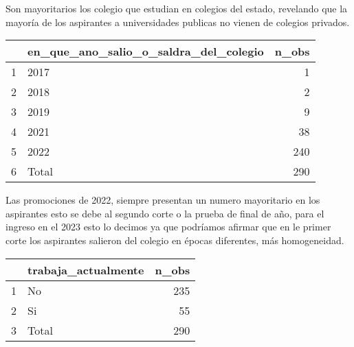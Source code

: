 \documentclass[
]{article}
\newenvironment{Shaded}{\begin{snugshade}}{\end{snugshade}}
\newcommand{\AttributeTok}[1]{\textcolor[rgb]{0.77,0.63,0.00}{#1}}
\newcommand{\CommentTok}[1]{\textcolor[rgb]{0.56,0.35,0.01}{\textit{#1}}}
\newcommand{\ConstantTok}[1]{\textcolor[rgb]{0.00,0.00,0.00}{#1}}
\newcommand{\FunctionTok}[1]{\textcolor[rgb]{0.00,0.00,0.00}{#1}}
\newcommand{\NormalTok}[1]{#1}
\newcommand{\OtherTok}[1]{\textcolor[rgb]{0.56,0.35,0.01}{#1}}
\newcommand{\StringTok}[1]{\textcolor[rgb]{0.31,0.60,0.02}{#1}}
\begin{document}
Son mayoritarios los colegio que estudian en colegios del estado,
revelando que la mayoría de los aspirantes a universidades publicas no
vienen de colegios privados.

\begin{Shaded}
\end{Shaded}

\begin{table}[ht]
\centering
\begin{tabular}{rlr}
  \hline
 & en\_que\_ano\_salio\_o\_saldra\_del\_colegio & n\_obs \\ 
  \hline
1 & 2017 &   1 \\ 
  2 & 2018 &   2 \\ 
  3 & 2019 &   9 \\ 
  4 & 2021 &  38 \\ 
  5 & 2022 & 240 \\ 
  6 & Total & 290 \\ 
   \hline
\end{tabular}
\end{table}

Las promociones de 2022, siempre presentan un numero mayoritario en los
aspirantes esto se debe al segundo corte o la prueba de final de año,
para el ingreso en el 2023 esto lo decimos ya que podríamos afirmar que
en le primer corte los aspirantes salieron del colegio en épocas
diferentes, más homogeneidad.

\begin{Shaded}
\end{Shaded}

\begin{table}[ht]
\centering
\begin{tabular}{rlr}
  \hline
 & trabaja\_actualmente & n\_obs \\ 
  \hline
1 & No & 235 \\ 
  2 & Si &  55 \\ 
  3 & Total & 290 \\ 
   \hline
\end{tabular}
\end{table}
\end{document}
